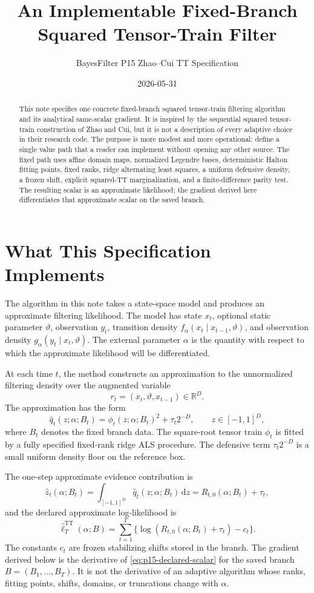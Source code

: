 \documentclass[11pt]{article}
\title{An Implementable Fixed-Branch Squared Tensor-Train Filter}
\author{BayesFilter P15 Zhao--Cui TT Specification}
\date{2026-05-31}
\newcommand{\R}{\mathbb{R}}
\newcommand{\dd}{\mathrm{d}}
\newcommand{\TT}{\mathrm{TT}}
\theoremstyle{definition}
\theoremstyle{remark}
\renewcommand{\[}{\begin{equation}}
\renewcommand{\]}{\end{equation}}
\begin{document}
\maketitle

\begin{abstract}
This note specifies one concrete fixed-branch squared tensor-train filtering
algorithm and its analytical same-scalar gradient.  It is inspired by the
sequential squared tensor-train construction of Zhao and Cui, but it is not a
description of every adaptive choice in their research code.  The purpose is
more modest and more operational: define a single value path that a reader can
implement without opening any other source.  The fixed path uses affine domain
maps, normalized Legendre bases, deterministic Halton fitting points, fixed
ranks, ridge alternating least squares, a uniform defensive density, a frozen
shift, explicit squared-TT marginalization, and a finite-difference parity
test.  The resulting scalar is an approximate likelihood; the gradient derived
here differentiates that approximate scalar on the saved branch.
\end{abstract}

\tableofcontents

\section{What This Specification Implements}

The algorithm in this note takes a state-space model and produces an
approximate filtering likelihood.  The model has state \(x_t\), optional static
parameter \(\vartheta\), observation \(y_t\), transition density
\(f_\alpha(x_t\mid x_{t-1},\vartheta)\), and observation density
\(g_\alpha(y_t\mid x_t,\vartheta)\).  The external parameter \(\alpha\) is the
quantity with respect to which the approximate likelihood will be
differentiated.

At each time \(t\), the method constructs an approximation to the unnormalized
filtering density over the augmented variable
\[
  r_t=(x_t,\vartheta,x_{t-1})\in\R^D.
\]
The approximation has the form
\[
  \widehat q_t(z;\alpha;B_t)
  =
  \phi_t(z;\alpha;B_t)^2+\tau_t 2^{-D},
  \qquad z\in[-1,1]^D,
  \label{eq:p15-qhat}
\]
where \(B_t\) denotes the fixed branch data.  The square-root tensor train
\(\phi_t\) is fitted by a fully specified fixed-rank ridge ALS procedure.  The
defensive term \(\tau_t2^{-D}\) is a small uniform density floor on the
reference box.

The one-step approximate evidence contribution is
\[
  \widehat z_t(\alpha;B_t)
  =
  \int_{[-1,1]^D}\widehat q_t(z;\alpha;B_t)\,\dd z
  =
  R_{t,0}(\alpha;B_t)+\tau_t,
  \label{eq:p15-zhat}
\]
and the declared approximate log-likelihood is
\[
  \widehat\ell_T^{\TT}(\alpha;B)
  =
  \sum_{t=1}^T
  \{\log(R_{t,0}(\alpha;B_t)+\tau_t)-c_t\}.
  \label{eq:p15-declared-scalar}
\]
The constants \(c_t\) are frozen stabilizing shifts stored in the branch.  The
gradient derived below is the derivative of \eqref{eq:p15-declared-scalar} for
the saved branch \(B=(B_1,\ldots,B_T)\).  It is not the derivative of an
adaptive algorithm whose ranks, fitting points, shifts, domains, or
truncations change with \(\alpha\).
\end{document}
